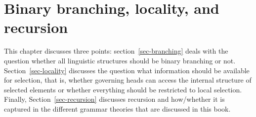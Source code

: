 
\chapter{Binary branching, locality, and recursion}

This chapter discusses three points: section~\ref{sec-branching} deals with the question whether all
linguistic structures should be binary branching or not. Section~\ref{sec-locality} discusses the
question what information should be available for selection, that is, whether governing heads can
access the internal structure of selected elements or whether everything should be restricted to
local selection. Finally, Section~\ref{sec-recursion} discusses recursion and how/whether it is
captured in the different grammar theories that are discussed in this book.




